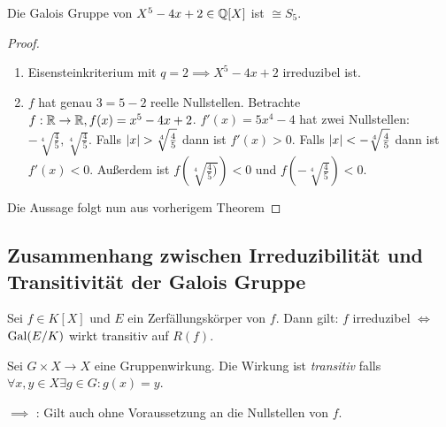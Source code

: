 \begin{corollary}
	Die Galois Gruppe von $X^{5} - 4x + 2 \in \mathbb{Q}[X]$ ist $\cong S_{5}$.
\end{corollary}

\begin{proof}
	\begin{enumerate}[(1)]
		\item Eisensteinkriterium mit $q = 2 \implies X^{5} - 4x +2$ irreduzibel ist.
		\item $f$ hat genau $3 = 5-2$ reelle Nullstellen. Betrachte $f : \mathbb{R} \to \mathbb{R}, f(x) = x^{5} - 4x + 2$.
			$f'(x) = 5x^{4} - 4$ hat zwei Nullstellen: $- \sqrt[4]{\frac{4}{5}}, \sqrt[4]{\frac{4}{5}} $.
			Falls $\abs{x} >  \sqrt[4]{\frac{4}{5}}$ dann ist $f'(x) > 0$.
			Falls $\abs{x} < -\sqrt[4]{\frac{4}{5}}$ dann ist $f'(x) < 0$.
			Außerdem ist $f(\sqrt[4]{\frac{4}{5})}) < 0$ und  $f(-\sqrt[4]{\frac{4}{5}}) < 0 $.
	\end{enumerate}
	Die Aussage folgt nun aus vorherigem Theorem
\end{proof}

\subsection{Zusammenhang zwischen Irreduzibilität und Transitivität der Galois Gruppe}
\begin{corollary}
	Sei $f \in K[X]$ und $E$ ein Zerfällungskörper von $f$.
	Dann gilt: $f$ irreduzibel $\Leftrightarrow$ $\operatorname{Gal}(E / K)$ wirkt transitiv auf $R(f)$.
\end{corollary}

Sei $G \times X \to X$ eine Gruppenwirkung. Die Wirkung ist \emph{transitiv} falls $\forall x,y \in X \exists g \in G : g(x) = y$.

\begin{claim}
	$\implies$ : Gilt auch ohne Voraussetzung an die Nullstellen von $f$.
\end{claim}

